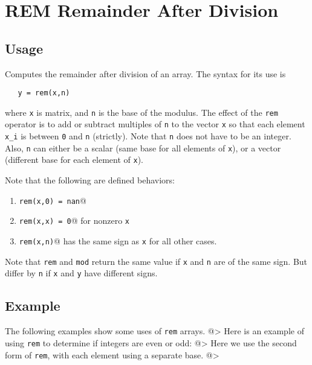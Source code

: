 \section{REM Remainder After Division}

\subsection{Usage}

Computes the remainder after division of an array.  The syntax for its use is
\begin{verbatim}
   y = rem(x,n)
\end{verbatim}
where \verb|x| is matrix, and \verb|n| is the base of the modulus.  The
effect of the \verb|rem| operator is to add or subtract multiples of \verb|n|
to the vector \verb|x| so that each element \verb|x_i| is between \verb|0| and \verb|n|
(strictly).  Note that \verb|n| does not have to be an integer.  Also,
\verb|n| can either be a scalar (same base for all elements of \verb|x|), or a
vector (different base for each element of \verb|x|).

Note that the following are defined behaviors:
\begin{enumerate}
\item  \verb|rem(x,0) = nan|@

\item  \verb|rem(x,x) = 0|@ for nonzero \verb|x|

\item  \verb|rem(x,n)|@ has the same sign as \verb|x| for all other cases.

\end{enumerate}
Note that \verb|rem| and \verb|mod| return the same value if \verb|x| and \verb|n|
are of the same sign.  But differ by \verb|n| if \verb|x| and \verb|y| have 
different signs.
\subsection{Example}

The following examples show some uses of \verb|rem|
arrays.
@>
Here is an example of using \verb|rem| to determine if integers are even
 or odd:
@>
Here we use the second form of \verb|rem|, with each element using a 
separate base.
@>
